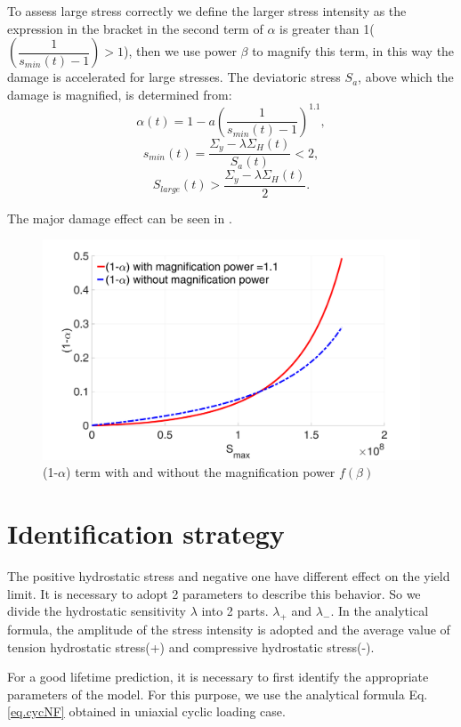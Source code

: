 To assess large stress correctly we define the larger stress intensity as the expression in the bracket in the second term of $\alpha$ is greater than 1($\left( \dfrac{1}{ s_{min}(t)-1 } \right)>1$), then we use power $\beta$ to magnify this term, in this way the damage is accelerated for large stresses. The deviatoric stress $S_{a}$, above which the damage is magnified,  is determined from: 
$$\alpha(t)=1-a\left( \dfrac{1}{ s_{min}(t)-1 } \right)^{1.1},$$
$$s_{min}(t)=\dfrac{\Sigma_y-\lambda \Sigma_H(t)}{S_{a}(t)}<2,$$
$$S_{large}(t)>\dfrac{\Sigma_y-\lambda \Sigma_H(t)}{2}.$$ 

The major damage effect can be seen in .

\begin{figure}[!h]
\centering
\includegraphics[width=\textwidth]{figures//alp_Smax_fb.png} 
\caption{(1-$\alpha$) term with and without the magnification power $f(\beta)$}
\label{fig.SmaxSequence}
\end{figure}

\clearpage
\section{Identification strategy}
\label{sec:5.9}
The positive hydrostatic stress and negative one have different effect on the yield limit. It is necessary to adopt 2 parameters to describe this behavior. So we divide the hydrostatic sensitivity $\lambda$ into 2 parts. $\lambda_+$ and $\lambda_-$. In the analytical formula, the amplitude of the stress intensity is adopted and the average value of tension hydrostatic stress(+) and compressive hydrostatic stress(-).

For a good lifetime prediction, it is necessary to first identify the appropriate parameters of the model. For this purpose, we use the analytical formula Eq.\eqref{eq.cycNF} obtained in uniaxial cyclic loading case.

